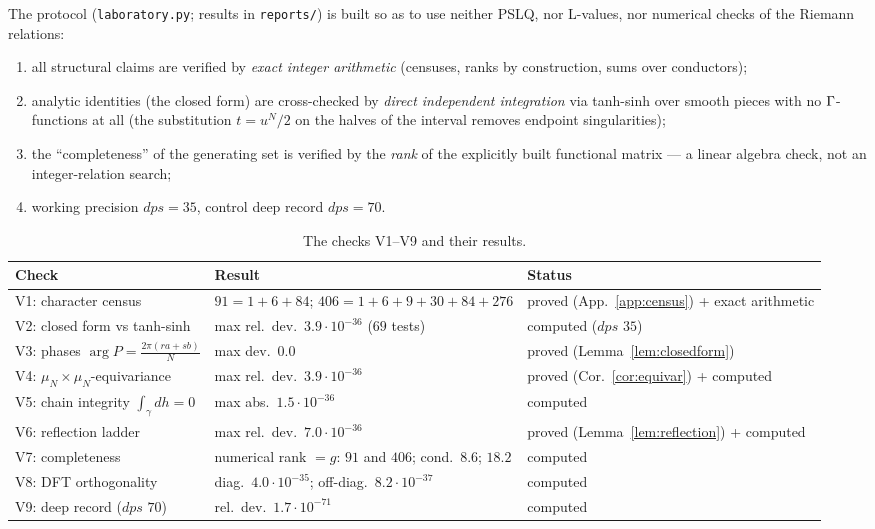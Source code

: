 The protocol (\texttt{laboratory.py}; results in \texttt{reports/})
is built so as to use neither PSLQ, nor L-values, nor numerical
checks of the Riemann relations:
\begin{enumerate}[leftmargin=2em, itemsep=0.15em]
\item all structural claims are verified by \emph{exact integer
  arithmetic} (censuses, ranks by construction, sums over
  conductors);
\item analytic identities (the closed form) are cross-checked by
  \emph{direct independent integration} via tanh-sinh over smooth
  pieces with no $\Gamma$-functions at all (the substitution $t=u^N/2$
  on the halves of the interval removes endpoint singularities);
\item the ``completeness'' of the generating set is verified by the
  \emph{rank} of the explicitly built functional matrix --- a linear
  algebra check, not an integer-relation search;
\item working precision $dps=35$, control deep record $dps=70$.
\end{enumerate}

\begin{table}[t]
\centering
\caption{The checks V1--V9 and their results.}
\label{tab:vprotocol}
\small
\begin{tabularx}{\textwidth}{@{}l >{\raggedright\arraybackslash}X >{\raggedright\arraybackslash}p{4.3cm}@{}}
\toprule
Check & Result & Status \\
\midrule
V1: character census & $91=1+6+84$;
  $406=1+6+9+30+84+276$ & proved (App.~\ref{app:census}) + exact
  arithmetic \\
V2: closed form vs tanh-sinh & max rel.\ dev.\
  $3.9\cdot10^{-36}$ ($69$ tests) & computed ($dps$ $35$) \\
V3: phases $\arg P=\frac{2\pi(ra+sb)}{N}$ & max dev.\ $0.0$ &
  proved (Lemma~\ref{lem:closedform}) \\
V4: $\mu_N\times\mu_N$-equivariance & max rel.\ dev.\
  $3.9\cdot10^{-36}$ & proved (Cor.~\ref{cor:equivar}) + computed \\
V5: chain integrity $\int_\gamma dh=0$ & max abs.\
  $1.5\cdot10^{-36}$ & computed \\
V6: reflection ladder & max rel.\ dev.\ $7.0\cdot10^{-36}$ &
  proved (Lemma~\ref{lem:reflection}) + computed \\
V7: completeness & numerical rank $=g$: $91$ and $406$; cond.\
  $8.6$; $18.2$ & computed \\
V8: DFT orthogonality & diag.\ $4.0\cdot10^{-35}$; off-diag.\
  $8.2\cdot10^{-37}$ & computed \\
V9: deep record ($dps$ $70$) & rel.\ dev.\ $1.7\cdot10^{-71}$ &
  computed \\
\bottomrule
\end{tabularx}
\end{table}

